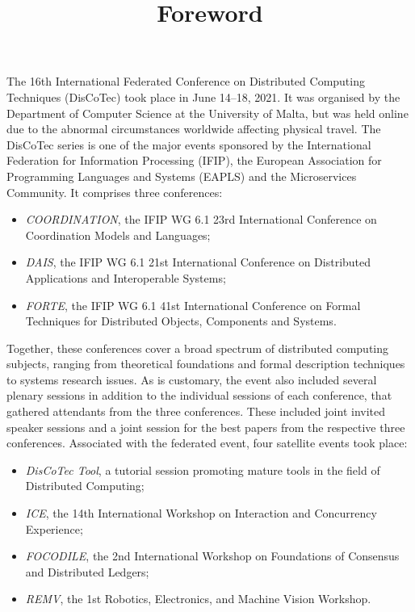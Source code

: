 \documentclass[10pt]{article}
\title{Foreword}
\date{}
\begin{document}
\maketitle

The 16th International Federated Conference on Distributed Computing Techniques (DisCoTec) took place in June 14–18, 2021. 
%
It was organised by the Department of Computer Science at the University of Malta, but was held online due to the abnormal circumstances worldwide affecting physical travel.
%
The DisCoTec series is one of the major events sponsored by the International Federation for Information Processing (IFIP), the European Association for Programming Languages and Systems (EAPLS) and the Microservices Community. It comprises three conferences:
\begin{itemize}
  \item \emph{COORDINATION}, the IFIP WG 6.1 23rd International Conference on Coordination Models and Languages;
  \item \emph{DAIS}, the IFIP WG 6.1 21st International Conference on Distributed Applications and Interoperable Systems;
  \item \emph{FORTE}, the IFIP WG 6.1 41st International Conference on Formal Techniques for Distributed Objects, Components and Systems.
\end{itemize}

Together, these conferences cover a broad spectrum of distributed computing subjects, ranging from theoretical foundations and formal description techniques to systems research issues. 
%
As is customary, the event also included several plenary sessions in addition to the individual sessions of each conference, that gathered attendants from the three conferences.  
%
These included joint invited speaker sessions and a joint session for the best papers from the respective three conferences. 
%
Associated with the federated event, four satellite events took place:
\begin{itemize}
  \item \emph{DisCoTec Tool}, a tutorial session promoting mature tools in the field of Distributed Computing;
  \item  \emph{ICE}, the 14th International Workshop on Interaction and Concurrency Experience; 
  \item \emph{FOCODILE}, the 2nd International Workshop on Foundations of Consensus and Distributed Ledgers;
  \item \emph{REMV}, the 1st Robotics, Electronics, and Machine Vision Workshop. 
\end{itemize}
\end{document}
